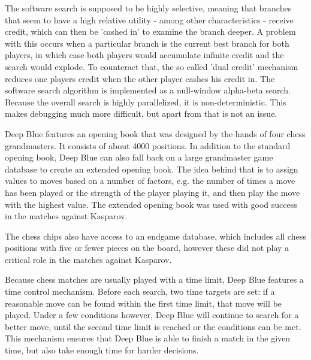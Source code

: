 \documentclass{article}
\begin{document}
  The software search is supposed to be highly selective, meaning that branches
  that seem to have a high relative utility - among other characteristics - receive
  credit, which can then be 'cashed in' to examine the branch deeper. A problem
  with this occurs when a particular branch is the current best branch for both
  players, in which case both players would accumulate infinite credit and the search
  would explode. To counteract that, the so called 'dual credit' mechanism reduces
  one players credit when the other player cashes his credit in.
  The software search algorithm is implemented as a null-window alpha-beta search.
  Because the overall search is highly parallelized, it is non-deterministic. This
  makes debugging much more difficult, but apart from that is not an issue.

  Deep Blue features an opening book that was designed by the hands of four chess
  grandmasters. It consists of about 4000 positions.
  In addition to the standard opening book, Deep Blue can also fall back on a large
  grandmaster game database to create an extended opening book. The idea behind that
  is to assign values to moves based on a number of factors, e.g. the number of times
  a move has been played or the strength of the player playing it, and then play
  the move with the highest value. The extended opening book was used with good
  success in the matches against Kasparov.

  The chess chips also have access to an endgame database, which includes all chess
  positions with five or fewer pieces on the board, however these did not play a
  critical role in the matches against Kasparov.

  Because chess matches are usually played with a time limit, Deep Blue features
  a time control mechanism. Before each search, two time targets are set: if a
  reasonable move can be found within the first time limit, that move will be played.
  Under a few conditions however, Deep Blue will continue to search for a better
  move, until the second time limit is reached or the conditions can be met. This
  mechanism ensures that Deep Blue is able to finish a match in the given time,
  but also take enough time for harder decisions.
\end{document}
